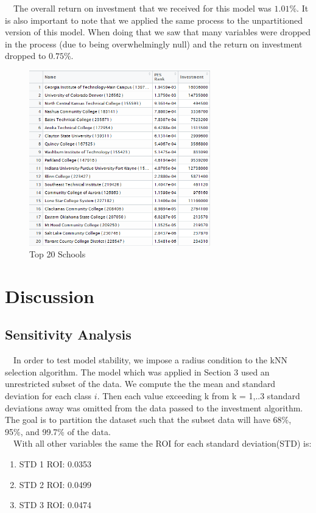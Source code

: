 \documentclass[12pt]{scrartcl}
\begin{document}
		\ \ The overall return on investment that we received for this model was $1.01$\%. It is also important to note that we applied the same process to the unpartitioned version of this model. When doing that we saw that many variables were dropped in the process (due to being overwhelmingly null) and the return on investment dropped to $0.75$\%.
		\begin{figure}[H]
			\centering
			\includegraphics[width=0.7\textwidth]{final.png}
			\caption{Top 20 Schools}
			\label{fig:top20}
		\end{figure}	

\section{Discussion} 
	\subsection{Sensitivity Analysis}
		
		\ \ In order to test model stability, we impose a radius condition to the kNN selection algorithm. The model which was applied in Section 3 used an unrestricted subset of the data. We compute the the mean and standard deviation for each class $i$. Then each value exceeding k from k = 1,..3 standard deviations away was omitted from the data passed to the investment algorithm. The goal is to partition the dataset such that the subset data will have 68\%, 95\%, and 99.7\% of the data.\\

		\ \ With all other variables the same the ROI for each standard deviation(STD) is:
		\begin{enumerate}
		\item STD 1 ROI: 0.0353
		\item STD 2 ROI: 0.0499
		\item STD 3 ROI: 0.0474
		\end{enumerate}
\end{document}
